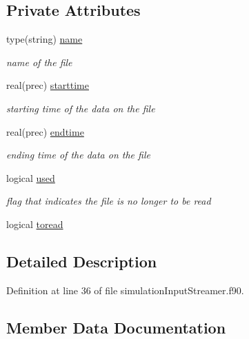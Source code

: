 \subsection*{Private Attributes}
\begin{DoxyCompactItemize}
\item 
type(string) \mbox{\hyperlink{structsimulationinputstreamer__mod_1_1inputfilemodel__class_a882b0dfc49829e8a04905a7ead0e97a3}{name}}
\begin{DoxyCompactList}\small\item\em name of the file \end{DoxyCompactList}\item 
real(prec) \mbox{\hyperlink{structsimulationinputstreamer__mod_1_1inputfilemodel__class_a722618dceb1aeba15c68e5313a14405f}{starttime}}
\begin{DoxyCompactList}\small\item\em starting time of the data on the file \end{DoxyCompactList}\item 
real(prec) \mbox{\hyperlink{structsimulationinputstreamer__mod_1_1inputfilemodel__class_ad25a4514610666475497835d54346a76}{endtime}}
\begin{DoxyCompactList}\small\item\em ending time of the data on the file \end{DoxyCompactList}\item 
logical \mbox{\hyperlink{structsimulationinputstreamer__mod_1_1inputfilemodel__class_a003333db579141a5b52c141b591cc86b}{used}}
\begin{DoxyCompactList}\small\item\em flag that indicates the file is no longer to be read \end{DoxyCompactList}\item 
logical \mbox{\hyperlink{structsimulationinputstreamer__mod_1_1inputfilemodel__class_a240b7aa50c7f8a2b5e67b40a0652c5ac}{toread}}
\end{DoxyCompactItemize}


\subsection{Detailed Description}


Definition at line 36 of file simulation\+Input\+Streamer.\+f90.



\subsection{Member Data Documentation}
\mbox{\label{structsimulationinputstreamer__mod_1_1inputfilemodel__class_ad25a4514610666475497835d54346a76}} 
